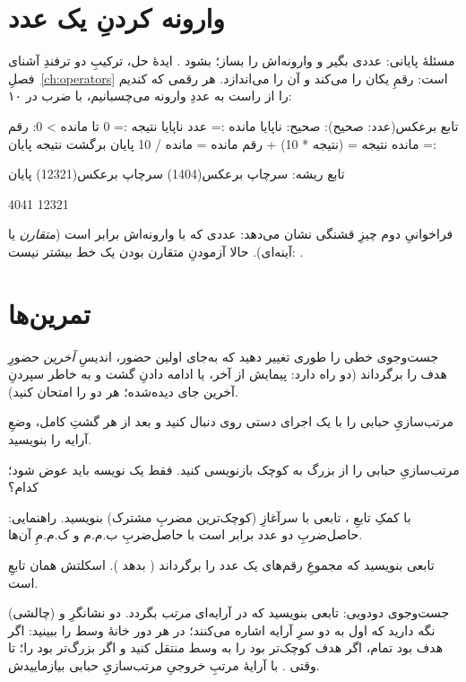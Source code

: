 \section{وارونه کردنِ یک عدد}

مسئلهٔ پایانی: عددی بگیر و وارونه‌اش را بساز؛  بشود
. ایدهٔ حل، ترکیبِ دو ترفندِ آشنای فصلِ~\ref{ch:operators}
است:  رقمِ یکان را می‌کند و  آن را می‌اندازد. هر
رقمی که کندیم را از راست به عددِ وارونه می‌چسبانیم، با ضرب در ۱۰:

\begin{salamfa}
تابع برعکس(عدد: صحیح): صحیح:
    ناپایا مانده := عدد
    ناپایا نتیجه := 0
    تا مانده > 0:
        رقم := مانده %
        نتیجه = (نتیجه * 10) + رقم
        مانده = مانده / 10
    پایان
    برگشت نتیجه
پایان

تابع ریشه:
    سرچاپ برعکس(1404)
    سرچاپ برعکس(12321)
پایان
\end{salamfa}

\begin{progout}
4041
12321
\end{progout}

فراخوانیِ دوم چیزِ قشنگی نشان می‌دهد: عددی که با وارونه‌اش برابر است
(\emph{متقارن} یا آینه‌ای). حالا آزمودنِ متقارن بودن یک خط بیشتر نیست:
.

\section{تمرین‌ها}

\exercise جست‌وجوی خطی را طوری تغییر دهید که به‌جای اولین حضور، اندیسِ
\emph{آخرین} حضورِ هدف را برگرداند (دو راه دارد: پیمایش از آخر، یا ادامه
دادنِ گشت و به خاطر سپردنِ آخرین جای دیده‌شده؛ هر دو را امتحان کنید).

\exercise مرتب‌سازیِ حبابی را با یک اجرای دستی روی \code{[5, 1, 4, 2]}
دنبال کنید و بعد از هر گشتِ کامل، وضعِ آرایه را بنویسید.

\exercise مرتب‌سازیِ حبابی را از بزرگ به کوچک بازنویسی کنید. فقط یک نویسه
باید عوض شود؛ کدام؟

\exercise با کمکِ تابعِ ، تابعی با سرآغازِ
 (کوچک‌ترین مضربِ مشترک) بنویسید.
راهنمایی: حاصل‌ضربِ دو عدد برابر است با حاصل‌ضربِ ب.م.م و ک.م.مِ آن‌ها.

\exercise تابعی بنویسید که مجموعِ رقم‌های یک عدد را برگرداند
( بدهد ). اسکلتش همان تابعِ  است.

\exercise (چالشی) جست‌وجوی دودویی: تابعی بنویسید که در آرایه‌ای
\emph{مرتب} بگردد. دو نشانگرِ  و  نگه دارید که اول
به دو سرِ آرایه اشاره می‌کنند؛ در هر دور خانهٔ وسط را ببینید: اگر هدف
بود تمام، اگر هدف کوچک‌تر بود  را به وسط منتقل کنید و اگر
بزرگ‌تر بود  را؛ تا وقتی . با آرایهٔ
مرتبِ خروجیِ مرتب‌سازیِ حبابی بیازماییدش.
